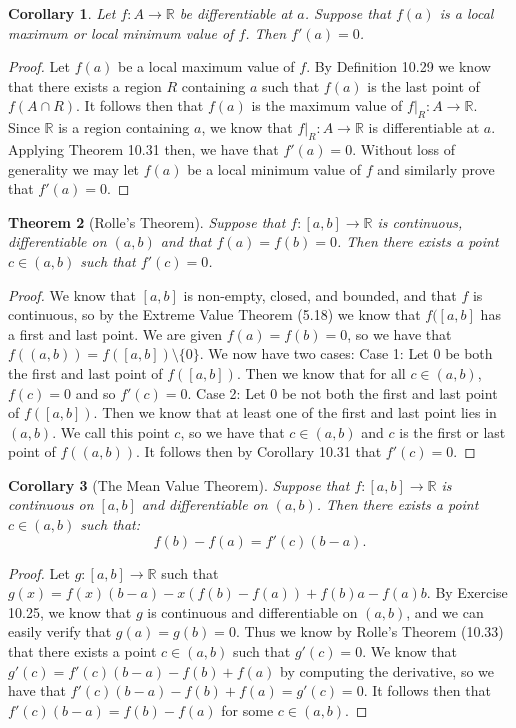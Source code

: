 \documentclass[12pt]{article}
\newcommand{\bbR}{\mathbb{R}}
\providecommand{\arr}{\longrightarrow}
\renewcommand{\_}[1]{\underline{ #1 }}
\newtheorem{theorem}{Theorem}[section]
\newtheorem{corollary}[theorem]{Corollary}
\theoremstyle{definition}
\numberwithin{equation}{subsection}
\begin{document}
\begin{corollary}  Let $f:A \arr \bbR$ be differentiable at $a$.  Suppose that $f(a)$ is a local maximum or local minimum value of $f$.  Then $f'(a) = 0$.
\end{corollary}

\begin{proof}
Let $f(a)$ be a local maximum value of $f$. By Definition 10.29 we know that there exists a region $R$ containing $a$ such that $f(a)$ is the last point of $f(A \cap R)$. It follows then that $f(a)$ is the maximum value of $f|_R : A \to \bbR$. Since $\bbR$ is a region containing $a$, we know that $f|_R : A \to \bbR$ is differentiable at $a$. Applying Theorem 10.31 then, we have that $f'(a) = 0$. \newline
Without loss of generality we may let $f(a)$ be a local minimum value of $f$ and similarly prove that $f'(a) = 0$.
\end{proof}

\begin{theorem}[Rolle's Theorem] 

Suppose that $f \colon [a, b] \arr \bbR$ is continuous,  differentiable on $(a, b)$ and that $f(a) = f(b) = 0$.  Then there exists a point $c \in (a, b)$ such that $f'(c) = 0$.
\end{theorem}

\begin{proof}
We know that $[a,b]$ is non-empty, closed, and bounded, and that $f$ is continuous, so by the Extreme Value Theorem (5.18) we know that $f([a,b]$ has a first and last point. We are given $f(a) = f(b) = 0$, so we have that $f((a,b)) = f([a,b]) \setminus \{0\}$. We now have two cases: \newline
Case 1: Let $0$ be both the first and last point of $f([a,b])$. Then we know that for all $c \in (a,b)$, $f(c) = 0$ and so $f'(c) = 0$. \newline
Case 2: Let $0$ be not both the first and last point of $f([a,b])$. Then we know that at least one of the first and last point lies in $(a,b)$. We call this point $c$, so we have that $c \in (a,b)$ and $c$ is the first or last point of $f((a,b))$. It follows then by Corollary 10.31 that $f'(c) = 0$.
\end{proof}

\begin{corollary}[The Mean Value Theorem]  

Suppose that $f \colon [a, b] \arr \bbR$ is continuous on $[a,b]$ and differentiable on $(a, b)$.  Then there exists a point $c \in (a, b)$ such that:
\[
f(b) - f(a) = f'(c) (b - a).
\]
\end{corollary}
\begin{proof}
Let $g:[a,b] \to \bbR$ such that $g(x) = f(x)(b-a) - x(f(b) - f(a)) + f(b)a - f(a)b$. By Exercise 10.25, we know that $g$ is continuous and differentiable on $(a,b)$, and we can easily verify that $g(a) = g(b) = 0$. Thus we know by Rolle's Theorem (10.33) that there exists a point $c \in (a,b)$ such that $g'(c) = 0$. We know that $g'(c) = f'(c)(b-a) - f(b) + f(a)$ by computing the derivative, so we have that $f'(c)(b-a) - f(b) + f(a) = g'(c) = 0$. It follows then that $f'(c)(b-a) = f(b) - f(a)$ for some $c \in (a,b)$.
\end{proof}
\end{document}
